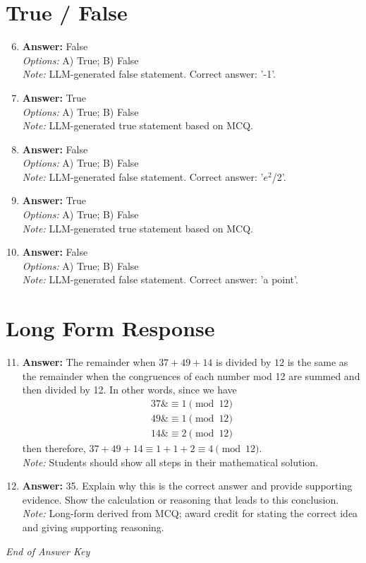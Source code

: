 \documentclass[12pt]{article}
\begin{document}
\section*{True / False}
\begin{enumerate}[label=\arabic*.]
\setcounter{enumi}{5}
\item \textbf{Answer:} False
\\ \textit{Options:} A) True; B) False
\\ \textit{Note:} LLM-generated false statement. Correct answer: '-1'.
\item \textbf{Answer:} True
\\ \textit{Options:} A) True; B) False
\\ \textit{Note:} LLM-generated true statement based on MCQ.
\item \textbf{Answer:} False
\\ \textit{Options:} A) True; B) False
\\ \textit{Note:} LLM-generated false statement. Correct answer: '$e^2$/2'.
\item \textbf{Answer:} True
\\ \textit{Options:} A) True; B) False
\\ \textit{Note:} LLM-generated true statement based on MCQ.
\item \textbf{Answer:} False
\\ \textit{Options:} A) True; B) False
\\ \textit{Note:} LLM-generated false statement. Correct answer: 'a point'.
\end{enumerate}

\section*{Long Form Response}
\begin{enumerate}[label=\arabic*.]
\setcounter{enumi}{10}
\item \textbf{Answer:} The remainder when $37+49+14$ is divided by $12$ is the same as the remainder when the congruences of each number mod 12 are summed and then divided by 12. In other words, since we have \begin{align*} 37 \&\ensuremath{\equiv} 1\ensuremath{\pmod{12}}\\ 49 \&\ensuremath{\equiv} 1\ensuremath{\pmod{12}} \\ 14 \&\ensuremath{\equiv} 2\ensuremath{\pmod{12}} \end{align*}then therefore, $37+49+14 \equiv 1+1+2 \equiv \boxed{4}\pmod{12}$.
\\ \textit{Note:} Students should show all steps in their mathematical solution.
\item \textbf{Answer:} 35. Explain why this is the correct answer and provide supporting evidence. Show the calculation or reasoning that leads to this conclusion.
\\ \textit{Note:} Long-form derived from MCQ; award credit for stating the correct idea and giving supporting reasoning.
\end{enumerate}

\vfill
\noindent\textit{End of Answer Key}
\end{document}
